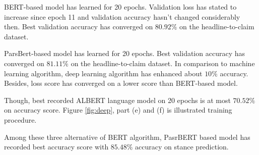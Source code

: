 BERT-based model has learned for 20 epochs. Validation loss has stated to increase since epoch 11 and validation accuracy hasn't changed considerably then. Best validation accuracy has converged on $80.92\%$ on the headline-to-claim dataset. 

ParsBert-based model has learned for 20 epochs. Best validation accuracy has converged on $81.11\%$ on the headline-to-claim dataset. In comparison to machine learning algorithm, deep learning algorithm has enhanced about $10\%$ accuracy. Besides, loss score has converged on a lower score than BERT-based model.

Though, best recorded ALBERT language model on 20 epochs is at most $70.52\%$ on accuracy score. Figure \ref{fig:deep}, part (e) and (f) is illustrated training procedure.

Among these three alternative of BERT algorithm, PasrBERT based model has recorded best accuracy score with $85.48\%$ accuracy on stance prediction.  
